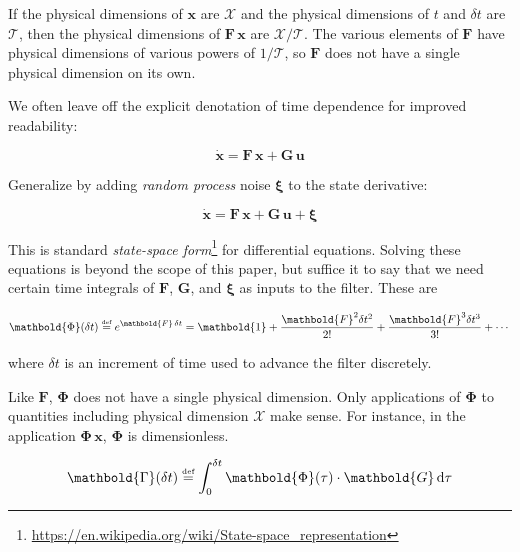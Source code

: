 \documentclass[10pt,oneside,x11names]{article}
\begin{document}
If the physical dimensions of \(\mathbold{x}\) are \(\mathcal{X}\) and the physical
dimensions of \(t\) and \(\delta t\) are \(\mathcal{T}\), then the physical dimensions
of \(\mathbold{F}\,\mathbold{x}\) are \(\mathcal{X}/\mathcal{T}\). The various
elements of \(\mathbold{F}\) have physical dimensions of various powers of
\(1/\mathcal{T}\), so \(\mathbold{F}\) does not have a single physical dimension on
its own.

We often leave off the explicit denotation of time dependence for improved readability:

\begin{equation*}
{\dot{\mathbold{x}}}=\mathbold{F}\,\mathbold{x}+\mathbold{G}\,\mathbold{u}
\end{equation*}

Generalize by adding \emph{random process} noise \(\mathbold{\xi}\) to the state
derivative:

\begin{equation}
\label{eqn:state-space-form}
{\dot{\mathbold{x}}}=
\mathbold{F}\,\mathbold{x}+
\mathbold{G}\,\mathbold{u}+
\mathbold{\xi}
\end{equation}

This is standard \emph{state-space form}\footnote{\url{https://en.wikipedia.org/wiki/State-space_representation}} for
differential equations. Solving these equations is beyond the scope of
this paper, but suffice it to say that we need certain time integrals of
\(\mathbold{F}\), \(\mathbold{G}\), and \(\mathbold{\xi}\) as inputs to the filter.
These are

\begin{equation}
\label{eqn:definition-of-Phi}
\mathbold{\Phi}(\delta t)\stackrel{\text{\tiny def}}{=}
e^{\mathbold{F}\,{\delta t}}=
\mathbold{1}+
\frac{\mathbold{F}^2{\delta t^2}}{2!}+
\frac{\mathbold{F}^3{\delta t^3}}{3!}+
\cdots
\end{equation}

\noindent where \(\delta t\) is an increment of time used to advance the filter
discretely.

Like \(\mathbold{F}\), \(\mathbold{\Phi}\) does not have a single 
physical dimension.
Only applications of \(\mathbold{\Phi}\) to quantities including physical dimension
\(\mathcal{X}\) make sense. For instance, in the application
\(\mathbold{\Phi}\,\mathbold{x}\), \(\mathbold{\Phi}\) is dimensionless. 

\begin{equation}
\label{eqn:definition-of-Gamma}
\mathbold{\Gamma}(\delta t)\stackrel{\text{\tiny def}}{=}
\int_{0}^{\delta t}{\mathbold{\Phi}(\tau) \cdot \mathbold{G}\,\textrm{d}\tau } 
\end{equation}
\end{document}
